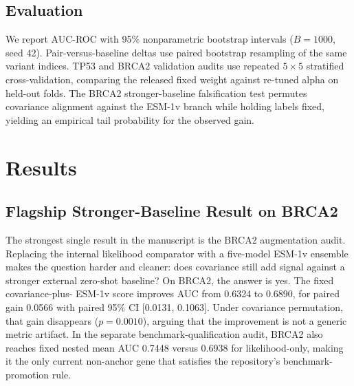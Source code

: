 \documentclass[10pt,twocolumn,letterpaper]{article}
\begin{document}
\subsection{Evaluation}

We report AUC-ROC with 95\% nonparametric bootstrap intervals ($B=1000$, seed 42).
Pair-versus-baseline deltas use paired bootstrap resampling of the same variant
indices. TP53 and BRCA2 validation audits use repeated $5\times5$ stratified
cross-validation, comparing the released fixed weight against re-tuned alpha on
held-out folds. The BRCA2 stronger-baseline falsification test permutes covariance
alignment against the ESM-1v branch while holding labels fixed, yielding an empirical
tail probability for the observed gain.

\section{Results}\label{sec:results}

\subsection{Flagship Stronger-Baseline Result on BRCA2}

The strongest single result in the manuscript is the BRCA2 augmentation audit.
Replacing the internal likelihood comparator with a five-model ESM-1v ensemble makes
the question harder and cleaner: does covariance still add signal against a stronger
external zero-shot baseline? On BRCA2, the answer is yes. The fixed covariance-plus-
ESM-1v score improves AUC from 0.6324 to 0.6890, for paired gain 0.0566 with paired
95\% CI [0.0131, 0.1063]. Under covariance permutation, that gain disappears
($p=0.0010$), arguing that the improvement is not a generic metric artifact. In the
separate benchmark-qualification audit, BRCA2 also reaches fixed nested mean AUC
0.7448 versus 0.6938 for likelihood-only, making it the only current non-anchor gene
that satisfies the repository's benchmark-promotion rule.
\end{document}

